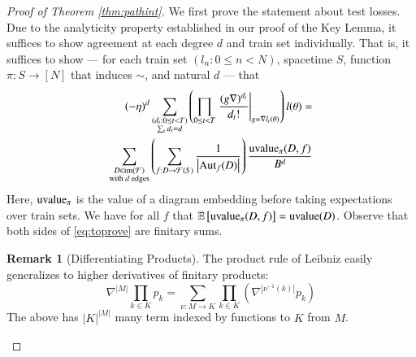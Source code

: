 \documentclass[openany, notitlepage, justified]{tufte-book}
\theoremstyle{plain}
\theoremstyle{definition}
\newtheorem{rmk}{Remark}
\newcommand{\wrap}[1]{\left(#1\right)}
\newcommand{\wabs}[1]{\left|#1\right|}
\newcommand{\Free}{\mathcal{F}}
\newcommand{\Aut}{\text{\textnormal{Aut}}}
\newcommand{\image}{\text{\textnormal{im}}}
\newcommand{\uvalue}{\text{\textnormal{uvalue}}}
\newcommand{\expct}[1]{\mathbb{E}\left[#1\right]}
\begin{document}
        \begin{proof}[Proof of Theorem \ref{thm:pathint}]
            We first prove the statement about test losses.
            Due to the analyticity property established in our proof of the
            Key Lemma, it suffices to show agreement at each degree $d$ and
            train set individually.  That is, it suffices to show --- for
            each train set $(l_n: 0\leq n<N)$, spacetime $S$, function $\pi:
            S\to [N]$ that induces $\sim$, and natural $d$ --- that
            \begin{align} \label{eq:toprove}
                (-\eta)^d
                \sum_{\substack{
                    (d_t: 0\leq t<T) \\
                    \sum_t d_t = d
                }}
                \wrap{
                    \prod_{0 \leq t < T} \left.
                        \frac{(g \nabla)^{d_t}}{d_t!}
                    \right|_{g=\nabla l_t(\theta)}
                } l (\theta)
                = \nonumber \\
                \sum_{\substack{
                    D \in \image(\Free) \\
                    \textnormal{with $d$ edges}
                }}
                \wrap{
                    \sum_{f: D\to\Free(S)}
                    \frac{1}{\wabs{\Aut_f(D)}}
                }
                \frac{\uvalue_\pi(D, f)}{B^{d}}
            \end{align}
            Here, $\uvalue_\pi$ is the value of a diagram embedding before
            taking expectations over train sets.  We have for all $f$ that
            $\expct{\uvalue_\pi(D, f)} = \uvalue(D)$.
            Observe that both sides of \ref{eq:toprove} are finitary sums.

            \begin{rmk}[Differentiating Products] \label{rmk:leibniz}
                The product rule of Leibniz easily generalizes to higher
                derivatives of finitary products:
                $$
                    \nabla^{\wabs{M}} \prod_{k \in K} p_k
                    = 
                    \sum_{\nu:M\to K} \prod_{k\in K} \wrap{
                        \nabla^{\wabs{\nu^{-1}(k)}} p_k
                    }
                $$
                The above has $\wabs{K}^{\wabs{M}}$ many term indexed by
                functions to $K$ from $M$.
            \end{rmk}


\end{proof}
\end{document}
